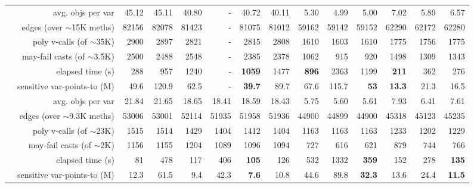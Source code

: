 \begin{table}
{\begin{tabular} {|c|r|r|r!{\vrule width 2pt}r|r|r|r!{\vrule width 2pt}r|r|r!{\vrule width 2pt}r|r|r|}
& avg. objs per var          & 45.12 & 45.11 & 40.80 & - & 40.72 & 40.11 & 5.30 & 4.99 & 5.00 & 7.02 & 5.89 & 6.57 \\
& edges (over $\sim$15K meths) & 82156 & 82078 & 81423 & - & 81075 & 81012 & 59162 & 59142 & 59152 & 62290 & 62172 & 62280 \\
& poly v-calls (of $\sim$35K)   & 2900 & 2897 & 2821 & - & 2815 & 2808 & 1610 & 1603 & 1610 & 1775 & 1756 & 1775 \\
& may-fail casts (of $\sim$3.5K)     & 2500 & 2488 & 2548 & - & 2385 & 2378 & 1062 & 915 & 920 & 1498 & 1309 & 1343 \\
& elapsed time (s)           & 288 & 957 & 1240 & - & {\bf 1059} & 1477 & {\bf 896} & 2363 & 1199 & {\bf 211} & 362 & 276 \\
& sensitive var-points-to (M)    & 49.6 & 120.9 & 62.5 & - & {\bf 39.7} & 89.7 & 67.6 & 115.7 & {\bf 53} & {\bf 13.3} & 21.3 & 16.5 \\

& avg. objs per var          & 21.84 & 21.65 & 18.65 & 18.41 & 18.59 & 18.43 & 5.75 & 5.60 & 5.61 & 7.93 & 6.41 & 7.61 \\
& edges (over $\sim$9.3K meths) & 53006 & 53001 & 52114 & 51935 & 51958 & 51936 & 44900 & 44899 & 44900 & 45318 & 45123 & 45235 \\
& poly v-calls (of $\sim$23K)   & 1515 & 1514 & 1429 & 1404 & 1412 & 1404 & 1163 & 1163 & 1163 & 1233 & 1202 & 1229 \\
& may-fail casts (of $\sim$2K)     & 1156 & 1155 & 1204 & 1089 & 1096 & 1094 & 727 & 616 & 621 & 879 & 744 & 766 \\
& elapsed time (s)           & 81 & 478 & 117 & 406 & {\bf 105} & 126 & 532 & 1332 & {\bf 359} & 152 & 278 & {\bf 135} \\
& sensitive var-points-to (M)    & 12.3 & 61.5 & 9.4 & 42.3 & {\bf 7.6} & 10.8 & 44.6 & 89.8 & {\bf 32.3} & 13.6 & 24.4 & {\bf 11.5} \\


\end{tabular}}
\end{table}
